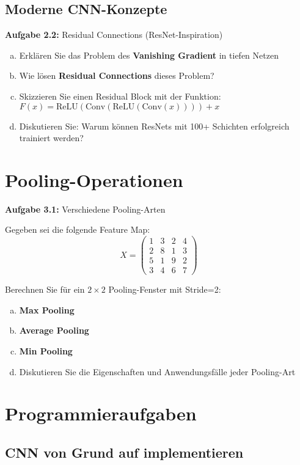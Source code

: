\documentclass[12pt,a4paper]{article}
\begin{document}
\subsection{Moderne CNN-Konzepte}

\textbf{Aufgabe 2.2:} Residual Connections (ResNet-Inspiration)

\begin{enumerate}[(a)]
    \item Erklären Sie das Problem des \textbf{Vanishing Gradient} in tiefen Netzen
    \item Wie lösen \textbf{Residual Connections} dieses Problem?
    \item Skizzieren Sie einen Residual Block mit der Funktion: \\
    $F(x) = \text{ReLU}(\text{Conv}(\text{ReLU}(\text{Conv}(x)))) + x$
    \item Diskutieren Sie: Warum können ResNets mit 100+ Schichten erfolgreich trainiert werden?
\end{enumerate}

\section{Pooling-Operationen}

\textbf{Aufgabe 3.1:} Verschiedene Pooling-Arten

Gegeben sei die folgende Feature Map:
$$X = \begin{pmatrix} 
1 & 3 & 2 & 4 \\
2 & 8 & 1 & 3 \\
5 & 1 & 9 & 2 \\
3 & 4 & 6 & 7
\end{pmatrix}$$

Berechnen Sie für ein $2 \times 2$ Pooling-Fenster mit Stride=2:
\begin{enumerate}[(a)]
    \item \textbf{Max Pooling}
    \item \textbf{Average Pooling}  
    \item \textbf{Min Pooling}
    \item Diskutieren Sie die Eigenschaften und Anwendungsfälle jeder Pooling-Art
\end{enumerate}

\section{Programmieraufgaben}

\subsection{CNN von Grund auf implementieren}
\end{document}
